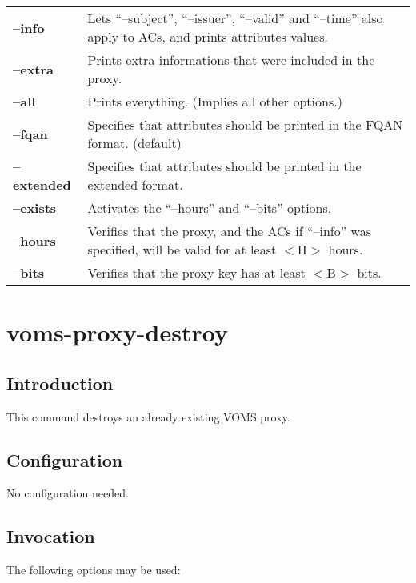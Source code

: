 \documentclass[a4paper]{book}
\begin{document}
\begin{longtable}{lp{3in}}
\textbf{--info}     & Lets ``--subject'', ``--issuer'', ``--valid''
		      and ``--time'' also apply to ACs, and prints
		      attributes values.\\
\textbf{--extra}    & Prints extra informations that were included in
		      the proxy.\\
\textbf{--all}      & Prints everything. (Implies all other
		      options.)\\
\textbf{--fqan}     & Specifies that attributes should be printed in
		      the FQAN format. (default)\\
\textbf{--extended} & Specifies that attributes should be printed in
		      the extended format.\\
\textbf{--exists}   & Activates the ``--hours'' and ``--bits''
		      options.\\
\textbf{--hours}    & Verifies that the proxy, and the ACs if
		      ``--info'' was specified, will be valid for at
		      least $<$H$>$ hours.\\
\textbf{--bits}     & Verifies that the proxy key has at least $<$B$>$
		      bits.\\
\end{longtable}


\chapter{voms-proxy-destroy}
\section{Introduction}
This command destroys an already existing VOMS proxy.

\section{Configuration}
No configuration needed.

\section{Invocation}
The following options may be used:
\end{document}
